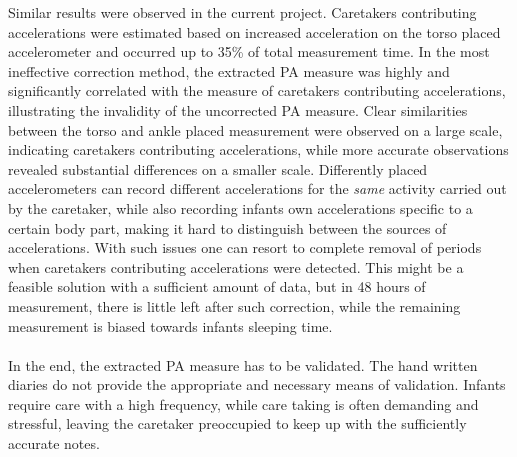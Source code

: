 \documentclass{article}
\begin{document}
{Similar results were observed in the current project. Caretakers contributing accelerations were estimated based on increased acceleration on the torso placed accelerometer and occurred up to 35\% of total measurement time. In the most ineffective correction method, the extracted PA measure was highly and significantly correlated with the measure of caretakers contributing accelerations, illustrating the invalidity of the uncorrected PA measure. Clear similarities between the torso and ankle placed measurement were observed on a large scale, indicating caretakers contributing accelerations, while more accurate observations revealed substantial differences on a smaller scale. Differently placed accelerometers can record different accelerations for the \textit{same} activity carried out by the caretaker, while also recording infants own accelerations specific to a certain body part, making it hard to distinguish between the sources of accelerations. With such issues one can resort to complete removal of periods when caretakers contributing accelerations were detected. This might be a feasible solution with a sufficient amount of data, but in 48 hours of measurement, there is little left after such correction, while the remaining measurement is biased towards infants sleeping time.
\\\\In the end, the extracted PA measure has to be validated. The hand written diaries do not provide the appropriate and necessary means of validation. Infants require care with a high frequency, while care taking is often demanding and stressful, leaving the caretaker preoccupied to keep up with the sufficiently accurate notes.

}
\end{document}

